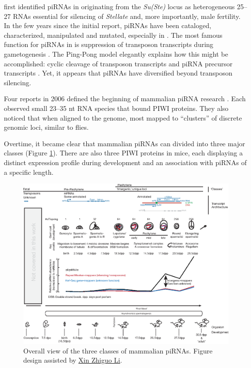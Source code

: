     \citet{Aravin2001} first identified piRNAs in \flies{} originating from the \textit{Su(Ste)} locus as heterogeneous 25--27 RNAs essential for silencing of \textit{Stellate} and, more importantly, male fertility. In the few years since the initial report, piRNAs have been cataloged, characterized, manipulated and mutated, especially in \flies{} \citep{Siomi2011,Luteijn2013,Hirose2014}. The most famous function for piRNAs in \flies{} is suppression of transposon transcripts during gametogenesis \citep{Malone2009}. The Ping-Pong model elegantly explains how this might be accomplished: cyclic cleavage of transposon transcripts and piRNA precursor transcripts \citep{Brennecke2007,Gunawardane2007}. Yet, it appears that piRNAs have diversified beyond transposon silencing.

    Four reports in 2006 defined the beginning of mammalian piRNA research \citep{Aravin2006,Grivna2006,Girard2006,Lau2006}. Each observed small 23--35 nt RNA species that bound PIWI proteins. They also noticed that when aligned to the genome, most mapped to ``clusters'' of discrete genomic loci, similar to flies.

    Overtime, it became clear that mammalian piRNAs can divided into three major classes (Figure \ref{Intro:fig:Mammalian piRNA classes}). There are also three PIWI proteins in mice, each displaying a distinct expression profile during development and an association with piRNAs of a specific length.

    \begin{landscape}
      \begin{figure} %
        \centering
        \includegraphics{Figures/Intro/MammalianPiRNAClassesOverTime.eps}
        \caption[Different Classes of mammalian piRNAs]
        {
          Overall view of the three classes of mammalian piRNAs. Figure design assisted by \href{mailto:xin.li@umassmed.edu}{Xin Zhiguo Li}.
          } \label{Intro:fig:Mammalian piRNA classes}
        \end{figure}
      \end{landscape}

